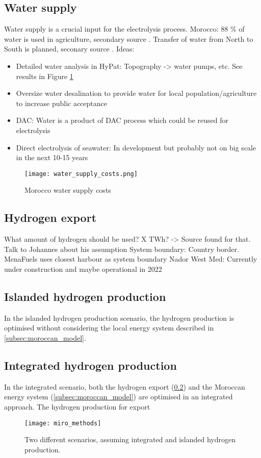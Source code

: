 \subsection{Water supply}
\label{subsec:water_supply}
Water supply is a crucial input for the electrolysis process. 
Morocco: 88 \% of water is used in agriculture, secondary source \cite{Ersoy2022}.
Transfer of water from North to South is planned, seconary source \cite{Ersoy2022}.
Ideas:
\begin{itemize}
    \item Detailed water analysis in HyPat: Topography -> water pumps, etc. See results in Figure \ref{fig:morocco_water}
    \item Oversize water desalination to provide water for local population/agriculture to increase public acceptance
    \item DAC: Water is a product of DAC process which could be reused for electrolysis
    \item Direct electrolysis of seawater: In development but probably not on big scale in the next 10-15 years
\end{itemize}

\begin{figure}[h!]
    \centering
    \texttt{[image: water\_supply\_costs.png]}
    \caption{Morocco water supply costs}
    \label{fig:morocco_water}
\end{figure}


\subsection{Hydrogen export}
\label{subsec:hydrogen_export}
What amount of hydrogen should be used? X TWh? -> Source found for that. Talk to Johannes about his assumption
System boundary: Country border. MenaFuels uses closest harbour as system boundary
Nador West Med: Currently under construction and maybe operational in 2022 \cite{Ersoy2022}



\subsection{Islanded hydrogen production}
In the islanded hydrogen production scenario, the hydrogen production is optimised without considering the local energy system described in \ref{subsec:moroccan_model}.


\subsection{Integrated hydrogen production}
In the integrated scenario, both the hydrogen export (\ref{subsec:hydrogen_export}) and the Moroccan energy system (\ref{subsec:moroccan_model})
are optimised in an integrated approach.
The hydrogen production for export


\begin{figure}[h!]
    \centering
    \texttt{[image: miro\_methods]}
    \caption{Two different scenarios, assuming integrated and islanded hydrogen production.}
    \label{fig:methods_scenarios}
\end{figure}

